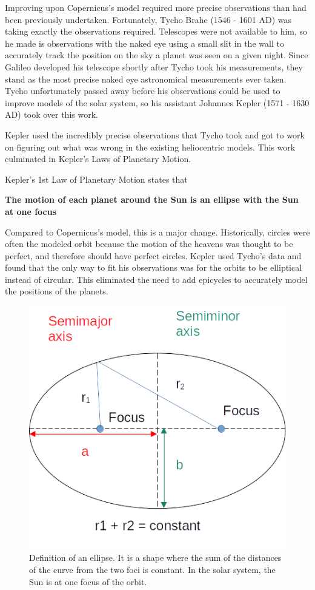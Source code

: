 \documentclass[12pt]{book}
\begin{document}
Improving upon Copernicus's model required more precise observations than had been previously undertaken. Fortunately, Tycho Brahe (1546 - 1601 AD) was taking exactly the observations required. Telescopes were not available to him, so he made is observations with the naked eye using a small slit in the wall to accurately track the position on the sky a planet was seen on a given night. Since Galileo developed his telescope shortly after Tycho took his measurements, they stand as the most precise naked eye astronomical measurements ever taken. Tycho unfortunately passed away before his observations could be used to improve models of the solar system, so his assistant Johannes Kepler (1571 - 1630 AD) took over this work.

Kepler used the incredibly precise observations that Tycho took and got to work on figuring out what was wrong in the existing heliocentric models. This work culminated in Kepler's Laws of Planetary Motion.

\linespace

Kepler's 1st Law of Planetary Motion states that

\hspace{10pt}

\textbf{The motion of each planet around the Sun is an ellipse with the Sun at one focus}

\linespace

Compared to Copernicus's model, this is a major change. Historically, circles were often the modeled orbit because the motion of the heavens was thought to be perfect, and therefore should have perfect circles. Kepler used Tycho's data and found that the only way to fit his observations was for the orbits to be elliptical instead of circular. This eliminated the need to add epicycles to accurately model the positions of the planets.

\begin{figure}[H]
\centering
\includegraphics[scale=0.8]{EllipseDef.png}
\caption{Definition of an ellipse. It is a shape where the sum of the distances of the curve from the two foci is constant. In the solar system, the Sun is at one focus of the orbit.}
\label{ellipsedef}
\end{figure}
\end{document}
